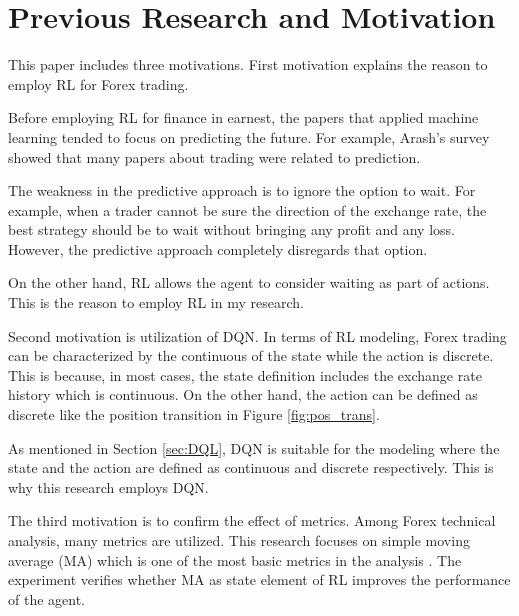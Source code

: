 \section{Previous Research and Motivation}
\label{sec:motivation}
This paper includes three motivations. First motivation explains the reason to employ RL for Forex trading. 

Before employing RL for finance in earnest, the papers that applied machine learning tended to focus on predicting the future. For example, Arash's survey \cite{bahrammirzaee2010} showed that many papers about trading were related to prediction.

The weakness in the predictive approach is to ignore the option to wait. For example, when a trader cannot be sure the direction of the exchange rate, the best strategy should be to wait without bringing any profit and any loss. However, the predictive approach completely disregards that option.

On the other hand, RL allows the agent to consider waiting as part of actions. This is the reason to employ RL in my research.

Second motivation is utilization of DQN. In terms of RL modeling, Forex trading can be characterized by the continuous of the state while the action is discrete. This is because, in most cases, the state definition includes the exchange rate history which is continuous. On the other hand, the action can be defined as discrete like the position transition in Figure \ref{fig:pos_trans}.

As mentioned in Section \ref{sec:DQL}, DQN is suitable for the modeling where the state and the action are defined as continuous and discrete respectively. This is why this research employs DQN.

The third motivation is to confirm the effect of metrics. Among Forex technical analysis, many metrics are utilized. This research focuses on simple moving average (MA) which is one of the most basic metrics in the analysis \cite{analysisMA}. The experiment verifies whether MA as state element of RL improves the performance of the agent.
